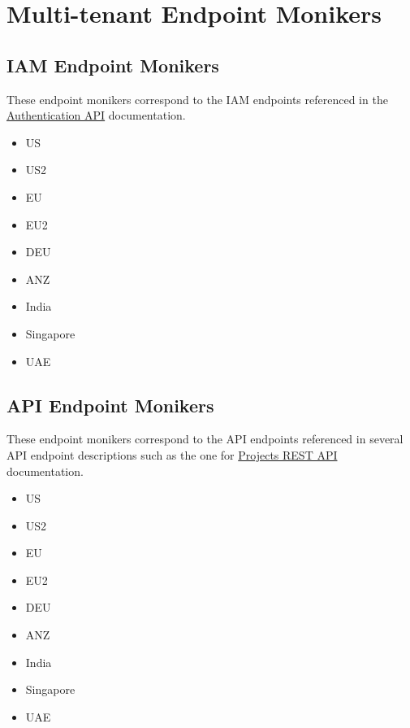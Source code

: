 \chapter{\cxone Multi-tenant Endpoint Monikers}
\label{sec:endpoint-monikers}


\section{IAM Endpoint Monikers}

These endpoint monikers correspond to the IAM endpoints referenced in the 
\href{https://checkmarx.stoplight.io/docs/checkmarx-one-api-reference-guide/branches/main/ywuqb5n3fas83-authentication-api#url}{\cxonetext Authentication API} documentation.

\begin{itemize}
    \item US
    \item US2
    \item EU
    \item EU2
    \item DEU
    \item ANZ
    \item India
    \item Singapore
    \item UAE
\end{itemize}


\section{API Endpoint Monikers}

These endpoint monikers correspond to the API endpoints referenced in several
API endpoint descriptions such as the one for 
\href{https://checkmarx.stoplight.io/docs/checkmarx-one-api-reference-guide/branches/main/ry3bnvw1ikz2h-projects-rest-api}{\cxonetext Projects REST API} documentation.




\begin{itemize}
    \item US
    \item US2
    \item EU
    \item EU2
    \item DEU
    \item ANZ
    \item India
    \item Singapore
    \item UAE
\end{itemize}
